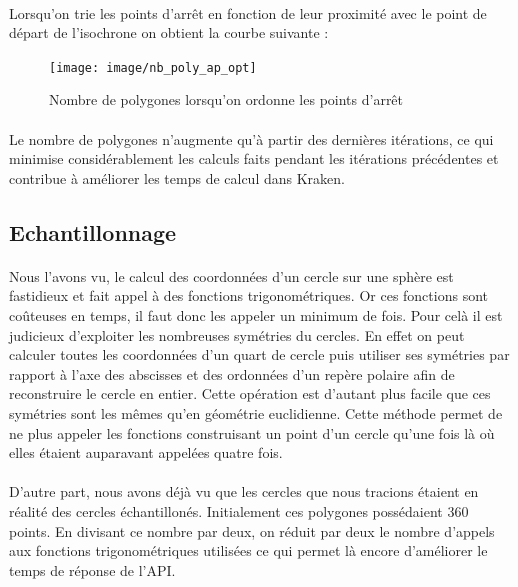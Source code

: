 \documentclass[a4paper]{report}
\begin{document}
\paragraph{} Lorsqu'on trie les points d'arrêt en fonction de leur proximité avec le point de départ de l'isochrone on obtient la courbe suivante :

\begin{figure}[H]
	\begin{center}
		\texttt{[image: image/nb\_poly\_ap\_opt]}
		\caption{Nombre de polygones lorsqu'on ordonne les points d'arrêt}
		\label{Nombre de polygones lorsqu'on ordonne les points d'arrêt}
	\end{center}
\end{figure}

\paragraph{} Le nombre de polygones n'augmente qu'à partir des dernières itérations, ce qui minimise considérablement les calculs faits pendant les itérations précédentes et contribue à améliorer les temps de calcul dans Kraken.

\subsection{Echantillonnage}

\paragraph{} Nous l'avons vu, le calcul des coordonnées d'un cercle sur une sphère est fastidieux et fait appel à des fonctions trigonométriques. Or ces fonctions sont coûteuses en temps, il faut donc les appeler un minimum de fois. Pour celà il est judicieux d'exploiter les nombreuses symétries du cercles. En effet on peut calculer toutes les coordonnées d'un quart de cercle puis utiliser ses symétries par rapport à l'axe des abscisses et des ordonnées d'un repère polaire afin de reconstruire le cercle en entier. Cette opération est d'autant plus facile que ces symétries sont les mêmes qu'en géométrie euclidienne. Cette méthode permet de ne plus appeler les fonctions construisant un point d'un cercle qu'une fois là où elles étaient auparavant appelées quatre fois.

\paragraph{} D'autre part, nous avons déjà vu que les cercles que nous tracions étaient en réalité des cercles échantillonés. Initialement ces polygones possédaient 360 points. En divisant ce nombre par deux, on réduit par deux le nombre d'appels aux fonctions trigonométriques utilisées ce qui permet là encore d'améliorer le temps de réponse de l'API.
\end{document}
